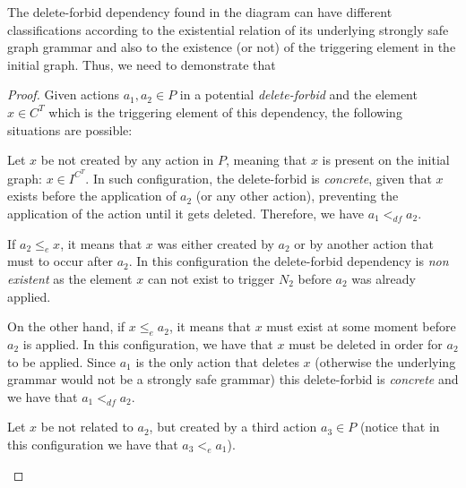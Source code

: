 The delete-forbid dependency found in the diagram can have different classifications according to the existential relation of its underlying strongly safe graph grammar and also to the existence (or not) of the triggering element in the initial graph. Thus, we need to demonstrate that


\begin{proof} Given actions $a_1,a_2 \in P$ in a potential \emph{delete-forbid} and the element $x \in C^T$ which is the triggering element of this dependency, the following situations are possible:
\hfill
\begin{description}[style=nextline,leftmargin=*]

  \item [Triggering element is present on the initial graph:]
Let $x$ be not created by any action in $P$, meaning that $x$ is present on the initial graph: $x \in I^{C^T}$. In such configuration, the delete-forbid is \emph{concrete}, given that $x$ exists before the application of $a_2$ (or any other action), preventing the application of the action until it gets deleted. Therefore, we have $a_1 <_{df} a_2$.

  \item [Triggering element is related to the action:] If $a_2 \leq_e x$, it means that $x$ was either created by $a_2$ or by another action that must to occur after $a_2$. In this configuration the delete-forbid dependency is \emph{non existent} as the element $x$ can not exist to trigger $N_2$ before $a_2$ was already applied.

    On the other hand, if $x \leq_e a_2$, it means that $x$ must exist at some moment before $a_2$ is applied. In this configuration, we have that $x$ must be deleted in order for $a_2$ to be applied. Since $a_1$ is the only action that deletes $x$ (otherwise the underlying grammar would not be a strongly safe grammar) this delete-forbid is \emph{concrete} and we have that $a_1 <_{df} a_2$.

\item [Triggering element is not related to the action:]
  Let $x$ be not related to $a_2$, but created by a third action $a_3 \in P$ (notice that in this configuration we have that $a_3 <_{e} a_1$).


\end{description}
\end{proof}
